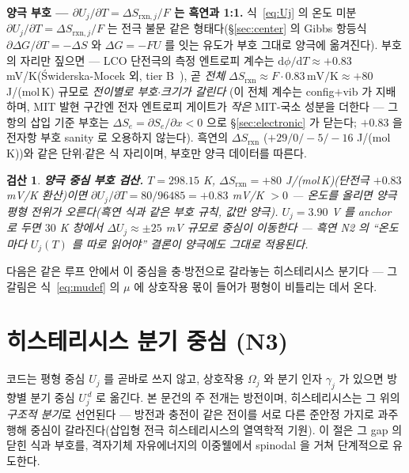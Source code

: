 \documentclass[11pt,a4paper]{article}
\newtheorem*{verifybox}{검산}
\newcommand{\dd}{\mathrm{d}}
\newcommand{\rxn}{\mathrm{rxn}}
\begin{document}
\textbf{양극 부호 — $\partial U_j/\partial T=\Delta S_{\rxn,j}/F$ 는 흑연과 1:1.} 식~\eqref{eq:Uj} 의 온도 미분
$\partial U_j/\partial T=\Delta S_{\rxn,j}/F$ 는 전극 불문 같은 형태다(\S\ref{sec:center} 의 Gibbs 항등식
$\partial\Delta G/\partial T=-\Delta S$ 와 $\Delta G=-FU$ 를 잇는 유도가 부호 그대로 양극에 옮겨진다). 부호의 자리만
짚으면 — LCO 단전극의 측정 엔트로피 계수는 $\dd\phi/\dd T\approx+0.83$ mV/K({\'S}widerska-Mocek 외, tier B~\cite{swiderska2019}), 곧 \emph{전체}
$\Delta S_{\rxn}\approx F\cdot0.83\,\mathrm{mV/K}\approx+80$ J/(mol\,K) 규모로 \emph{전이별로 부호$\cdot$크기가 갈린다}
(이 전체 계수는 config$+$vib 가 지배하며, MIT 발현 구간엔 전자 엔트로피 게이트가 \emph{작은} MIT-국소 성분을 더한다 —
그 항의 삽입 기준 부호는 $\Delta S_e=\partial S_e/\partial x<0$ 으로 \S\ref{sec:electronic} 가 닫는다; $+0.83$ 을 전자항 부호
sanity 로 오용하지 않는다). 흑연의 $\Delta S_\rxn$
($+29/0/-5/-16$ J/(mol\,K))와 같은 단위$\cdot$같은 식 자리이며, 부호만 양극 데이터를 따른다.

\begin{verifybox}
\textbf{양극 중심 부호 검산.} $T=298.15$ K, $\Delta S_\rxn=+80$ J/(mol\,K)(단전극 $+0.83$ mV/K 환산)이면
$\partial U_j/\partial T=80/96485=+0.83$ mV/K $>0$ — 온도를 올리면 양극 평형 전위가 \emph{오른다}(흑연 식과 같은 부호
규칙, 값만 양극). $U_j=3.90$ V 를 anchor 로 두면 $30$ K 창에서 $\Delta U_j\approx\pm25$ mV 규모로 중심이 이동한다 —
흑연 N2 의 ``온도마다 $U_j(T)$ 를 따로 읽어야'' 결론이 양극에도 그대로 적용된다.
\end{verifybox}

다음은 같은 루프 안에서 이 중심을 충$\cdot$방전으로 갈라놓는 히스테리시스 분기다 — 그 갈림은 식~\eqref{eq:mudef} 의
$\mu$ 에 상호작용 몫이 들어가 평형이 비틀리는 데서 온다.

\section{히스테리시스 분기 중심 (N3)}\label{sec:hys}
코드는 평형 중심 $U_j$ 를 곧바로 쓰지 않고, 상호작용 $\Omega_j$ 와 분기 인자 $\gamma_j$ 가 있으면 방향별 분기 중심
$U_j^{\,d}$ 로 옮긴다. 본 문건의 주 전개는 방전이며, 히스테리시스는 그 위의 \emph{구조적 분기}로 선언된다 — 방전과 충전이
같은 전이를 서로 다른 준안정 가지로 과주행해 중심이 갈라진다(삽입형 전극 히스테리시스의 열역학적 기원\cite{dreyer2010}).
이 절은 그 gap 의 닫힌 식과 부호를, 격자기체 자유에너지의
이중웰에서 spinodal 을 거쳐 단계적으로 유도한다.
\end{document}
